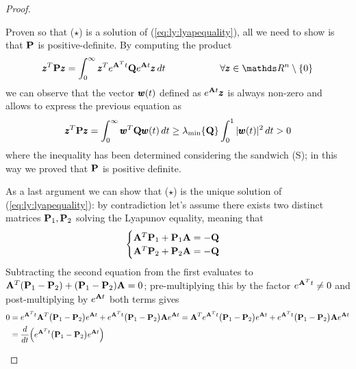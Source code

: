 \begin{proof}
\begin{enumerate}[\itshape a)]
		Proven so that ($\star$) is a solution of (\ref{eq:ly:lyapequality}), all we need to show is that $\P$ is positive-definite. By computing the product
		\[ \vet z^T \P \vet z = \int_0^\infty \vet z^T e^{\A^Tt} \Q e^{\A t} \vet z \, dt \hspace{2cm} \forall \vet z \in \mathds R^{n} \setminus \{0\} \]
		we can observe that the vector $\vet w(t)$ defined as $e^{\A t} \vet z$ is always non-zero and allows to express the previous equation as
		\[ \vet z^T \P \vet z = \int_0^\infty \vet w^T \Q \vet w(t) \, dt \geq \lambda_{\min}\{\Q\} \int_0^1 |\vet w(t)|^2\, dt > 0 \]
		where the inequality has been determined considering the sandwich (S); in this way we proved that $\P$ is positive definite.
		
		As a last argument we can show that ($\star$) is the unique solution of (\ref{eq:ly:lyapequality}): by contradiction let's assume there exists two distinct matrices $\P_1,\P_2$ solving the Lyapunov equality, meaning that
		\[ \begin{cases}
			\A^T \P_1 + \P_1 \A = - \Q \\
			\A^T \P_2 + \P_2 \A = - \Q
		\end{cases} \]
		Subtracting the second equation from the first evaluates to $\A^T(\P_1-\P_2) + (\P_1-\P_2) \A = 0$; pre-multiplying this by the factor $e^{\A^Tt} \neq 0$ and post-multiplying by $e^{\A t}$ both terms gives
		\begin{align*}
			0 & = e^{\A^Tt} \A^T \big(\P_1-\P_2\big) e^{\A t} + e^{\A^Tt} \big(\P_1-\P_2\big) \A e^{\A t} = \A^T e^{\A^Tt} \big(\P_1-\P_2\big) e^{\A t} + e^{\A^Tt} \big(\P_1-\P_2\big) \A e^{\A t} \\
			& = \frac {d}{dt}\Big(e^{\A^Tt} \big(\P_1-\P_2\big) e^{\A t}\Big)
		\end{align*}
		

\end{enumerate}
\end{proof}
